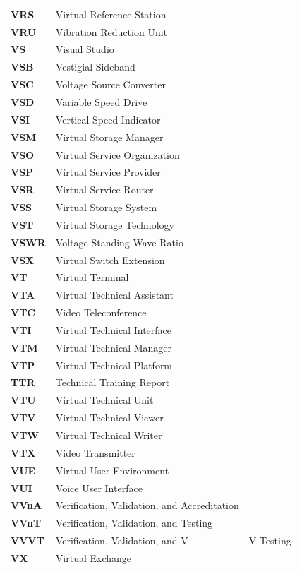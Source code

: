 \begin{longtable}{p{3cm}p{11cm}}
\textbf{VRS} & Virtual Reference Station \\
\textbf{VRU} & Vibration Reduction Unit \\
\textbf{VS} & Visual Studio \\
\textbf{VSB} & Vestigial Sideband \\
\textbf{VSC} & Voltage Source Converter \\
\textbf{VSD} & Variable Speed Drive \\
\textbf{VSI} & Vertical Speed Indicator \\
\textbf{VSM} & Virtual Storage Manager \\
\textbf{VSO} & Virtual Service Organization \\
\textbf{VSP} & Virtual Service Provider \\
\textbf{VSR} & Virtual Service Router \\
\textbf{VSS} & Virtual Storage System \\
\textbf{VST} & Virtual Storage Technology \\
\textbf{VSWR} & Voltage Standing Wave Ratio \\
\textbf{VSX} & Virtual Switch Extension \\
\textbf{VT} & Virtual Terminal \\
\textbf{VTA} & Virtual Technical Assistant \\
\textbf{VTC} & Video Teleconference \\
\textbf{VTI} & Virtual Technical Interface \\
\textbf{VTM} & Virtual Technical Manager \\
\textbf{VTP} & Virtual Technical Platform \\
\textbf{TTR} & Technical Training Report \\
\textbf{VTU} & Virtual Technical Unit \\
\textbf{VTV} & Virtual Technical Viewer \\
\textbf{VTW} & Virtual Technical Writer \\
\textbf{VTX} & Video Transmitter \\
\textbf{VUE} & Virtual User Environment \\
\textbf{VUI} & Voice User Interface \\
\textbf{VVnA} & Verification, Validation, and Accreditation \\
\textbf{VVnT} & Verification, Validation, and Testing \\
\textbf{VVVT} & Verification, Validation, and V&V Testing \\
\textbf{VX} & Virtual Exchange \\

\end{longtable}

